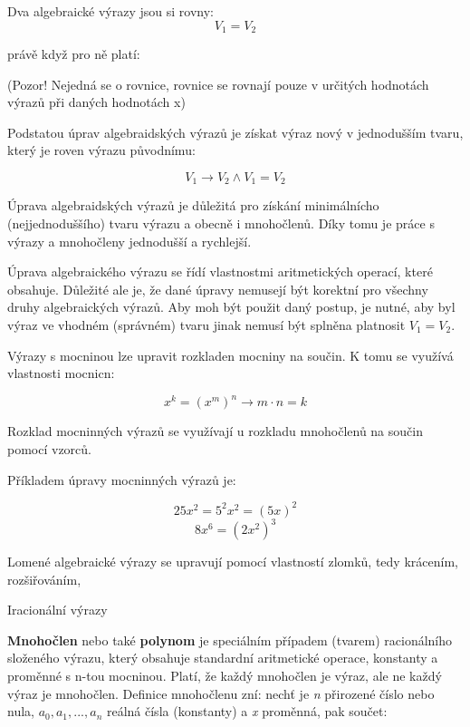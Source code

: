 Dva algebraické výrazy jsou si rovny:
$$ V_1 = V_2 $$

právě když pro ně platí:

\vskip 4mm
\vskip 4mm

(Pozor! Nejedná se o rovnice, rovnice se rovnají pouze v určitých hodnotách výrazů při daných hodnotách x)


Podstatou úprav algebraidských výrazů je získat výraz nový v jednodušším tvaru, který je roven výrazu původnímu:

$$ V_1 \rightarrow V_2 \wedge V_1 = V_2 $$

Úprava algebraidských výrazů je důležitá pro získání minimálnícho (nejjednoduššího) tvaru výrazu a obecně i mnohočlenů. Díky tomu je práce s výrazy a mnohočleny jednodušší a rychlejší. 

Úprava algebraického výrazu se řídí vlastnostmi aritmetických operací, které obsahuje. Důležité ale je, že dané úpravy nemusejí být korektní pro všechny druhy algebraických výrazů. Aby moh být použit daný postup, je nutné, aby byl výraz ve vhodném (správném) tvaru jinak nemusí být splněna platnosit $V_1 = V_2$. 


Výrazy s mocninou lze upravit rozkladen mocniny na součin. K tomu se využívá vlastnosti mocnicn:

$$ x^k =  (x^m)^n \rightarrow m\cdot n = k $$

Rozklad mocninných výrazů se využívají u rozkladu mnohočlenů na součin pomocí vzorců.

Příkladem úpravy mocninných výrazů je:

$$ 25x^2 = 5^2x^2 =(5x)^2 $$
$$ 8x^6 = (2x^2)^3 $$


Lomené algebraické výrazy se upravují pomocí vlastností zlomků, tedy krácením, rozšiřováním, 


Iracionální výrazy 




{\bf Mnohočlen} nebo také {\bf polynom} je speciálním případem (tvarem) racionálního složeného výrazu, který obsahuje standardní aritmetické operace, konstanty a proměnné s n-tou mocninou. Platí, že každý mnohočlen je výraz, ale ne každý výraz je mnohočlen. Definice mnohočlenu zní: nechť je {\it n} přirozené číslo nebo nula, $ a_0, a_1, ..., a_n$ reálná čísla (konstanty) a {\it x} proměnná, pak součet:

